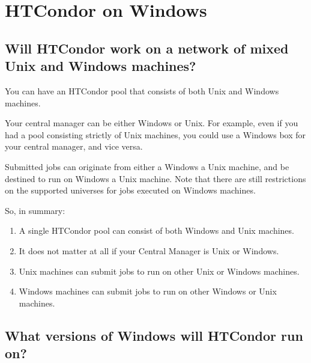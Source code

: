 \section{HTCondor on Windows}

\subsection*{Will HTCondor work on a network of mixed Unix and Windows machines?}

You can have an HTCondor pool that consists of both Unix and Windows machines.

Your central manager can be either Windows or Unix.  For example,
even if you had a pool consisting strictly of Unix machines, you could
use a Windows box for your central manager, and vice versa.

Submitted jobs can originate from either a 
Windows  a Unix machine,
and be destined to run on Windows
 a Unix machine.
Note that there are still restrictions on the supported universes
for jobs executed on Windows machines.

So, in summary:

\begin{enumerate}

\item{A single HTCondor pool can consist of both Windows and Unix
machines.}

\item{It does not matter at all if your Central Manager is Unix or Windows.}

\item{Unix machines can submit jobs to run on other Unix or Windows
machines.}

\item{Windows machines can submit jobs to run on other Windows
or Unix machines.}

\end{enumerate}


\subsection*{What versions of Windows will HTCondor run on?}

